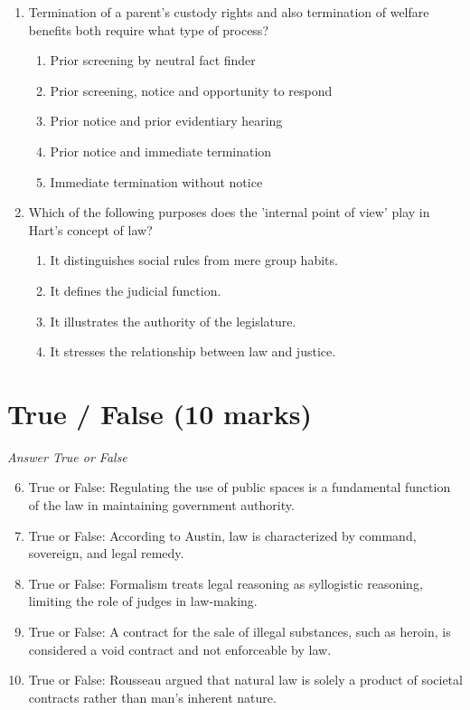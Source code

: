 \documentclass[12pt]{article}
\begin{document}
\begin{enumerate}[label=\arabic*.]
\begin{enumerate}[label=(\alph*)]
\end{enumerate}
\item Termination of a parent's custody rights and also termination of welfare benefits both require what type of process?
\begin{enumerate}[label=(\alph*)]
    \item Prior screening by neutral fact finder
    \item Prior screening, notice and opportunity to respond
    \item Prior notice and prior evidentiary hearing
    \item Prior notice and immediate termination
    \item Immediate termination without notice
\end{enumerate}
\item Which of the following purposes does the 'internal point of view' play in Hart's concept of law?
\begin{enumerate}[label=(\alph*)]
    \item It distinguishes social rules from mere group habits.
    \item It defines the judicial function.
    \item It illustrates the authority of the legislature.
    \item It stresses the relationship between law and justice.
\end{enumerate}
\end{enumerate}

\section*{True / False (10 marks)}
\textit{Answer True or False}
\begin{enumerate}[label=\arabic*.]
\setcounter{enumi}{5}
\item True or False: Regulating the use of public spaces is a fundamental function of the law in maintaining government authority.
\item True or False: According to Austin, law is characterized by command, sovereign, and legal remedy.
\item True or False: Formalism treats legal reasoning as syllogistic reasoning, limiting the role of judges in law-making.
\item True or False: A contract for the sale of illegal substances, such as heroin, is considered a void contract and not enforceable by law.
\item True or False: Rousseau argued that natural law is solely a product of societal contracts rather than man's inherent nature.
\end{enumerate}
\end{document}

